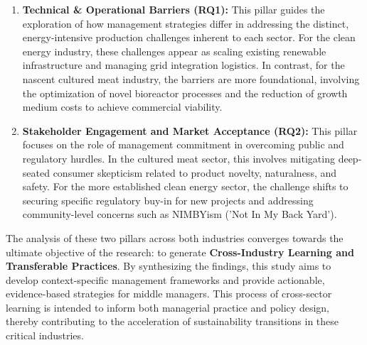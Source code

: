 \begin{enumerate}
	\item \textbf{Technical \& Operational Barriers (RQ1):} This pillar guides the exploration of how management strategies differ in addressing the distinct, energy-intensive production challenges inherent to each sector. For the clean energy industry, these challenges appear as scaling existing renewable infrastructure and managing grid integration logistics. In contrast, for the nascent cultured meat industry, the barriers are more foundational, involving the optimization of novel bioreactor processes and the reduction of growth medium costs to achieve commercial viability.
	
	\item \textbf{Stakeholder Engagement and Market Acceptance (RQ2):} This pillar focuses on the role of management commitment in overcoming public and regulatory hurdles. In the cultured meat sector, this involves mitigating deep-seated consumer skepticism related to product novelty, naturalness, and safety. For the more established clean energy sector, the challenge shifts to securing specific regulatory buy-in for new projects and addressing community-level concerns such as NIMBYism ('Not In My Back Yard').
\end{enumerate}

The analysis of these two pillars across both industries converges towards the ultimate objective of the research: to generate \textbf{Cross-Industry Learning and Transferable Practices}. By synthesizing the findings, this study aims to develop context-specific management frameworks and provide actionable, evidence-based strategies for middle managers. This process of cross-sector learning is intended to inform both managerial practice and policy design, thereby contributing to the acceleration of sustainability transitions in these critical industries.
